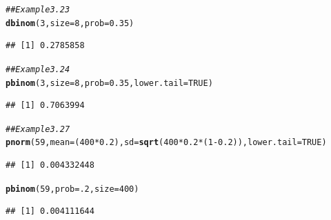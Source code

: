 \documentclass{report}\usepackage[]{graphicx}\usepackage[]{color}
\makeatletter
\newcommand{\hlnum}[1]{\textcolor[rgb]{0.686,0.059,0.569}{#1}}%
\newcommand{\hlcom}[1]{\textcolor[rgb]{0.678,0.584,0.686}{\textit{#1}}}%
\newcommand{\hlopt}[1]{\textcolor[rgb]{0,0,0}{#1}}%
\newcommand{\hlstd}[1]{\textcolor[rgb]{0.345,0.345,0.345}{#1}}%
\newcommand{\hlkwc}[1]{\textcolor[rgb]{0.333,0.667,0.333}{#1}}%
\newcommand{\hlkwd}[1]{\textcolor[rgb]{0.737,0.353,0.396}{\textbf{#1}}}%
\newenvironment{kframe}{%
 \def\at@end@of@kframe{}%
 \ifinner\ifhmode%
  \def\at@end@of@kframe{\end{minipage}}%
  \begin{minipage}{\columnwidth}%
 \fi\fi%
 \def\FrameCommand##1{\hskip\@totalleftmargin \hskip-\fboxsep
 \colorbox{shadecolor}{##1}\hskip-\fboxsep
     \hskip-\linewidth \hskip-\@totalleftmargin \hskip\columnwidth}%
 \MakeFramed {\advance\hsize-\width
   \@totalleftmargin\z@ \linewidth\hsize
   \@setminipage}}%
 {\par\unskip\endMakeFramed%
 \at@end@of@kframe}
\newenvironment{knitrout}{}{} %
\makeatother
\begin{document}
\begin{knitrout}
\color{fgcolor}\begin{kframe}
\begin{alltt}
\hlcom{## Example 3.23}
\hlkwd{dbinom}\hlstd{(}\hlnum{3}\hlstd{,} \hlkwc{size} \hlstd{=} \hlnum{8}\hlstd{,} \hlkwc{prob} \hlstd{=} \hlnum{0.35}\hlstd{)}
\end{alltt}
\begin{verbatim}
## [1] 0.2785858
\end{verbatim}
\end{kframe}
\end{knitrout}

\begin{knitrout}
\color{fgcolor}\begin{kframe}
\begin{alltt}
\hlcom{## Example 3.24}
\hlkwd{pbinom}\hlstd{(}\hlnum{3}\hlstd{,} \hlkwc{size} \hlstd{=} \hlnum{8}\hlstd{,} \hlkwc{prob} \hlstd{=} \hlnum{0.35}\hlstd{,} \hlkwc{lower.tail} \hlstd{=} \hlnum{TRUE}\hlstd{)}
\end{alltt}
\begin{verbatim}
## [1] 0.7063994
\end{verbatim}
\end{kframe}
\end{knitrout}

\begin{knitrout}
\color{fgcolor}\begin{kframe}
\begin{alltt}
\hlcom{## Example 3.27 }
\hlkwd{pnorm}\hlstd{(}\hlnum{59}\hlstd{,} \hlkwc{mean} \hlstd{= (}\hlnum{400}\hlopt{*}\hlnum{0.2}\hlstd{),} \hlkwc{sd} \hlstd{=} \hlkwd{sqrt}\hlstd{(}\hlnum{400}\hlopt{*}\hlnum{0.2}\hlopt{*}\hlstd{(}\hlnum{1}\hlopt{-}\hlnum{0.2}\hlstd{)),} \hlkwc{lower.tail} \hlstd{=} \hlnum{TRUE}\hlstd{)}
\end{alltt}
\begin{verbatim}
## [1] 0.004332448
\end{verbatim}
\begin{alltt}
\hlkwd{pbinom}\hlstd{(}\hlnum{59}\hlstd{,} \hlkwc{prob} \hlstd{=} \hlnum{.2}\hlstd{,} \hlkwc{size} \hlstd{=} \hlnum{400}\hlstd{)}
\end{alltt}
\begin{verbatim}
## [1] 0.004111644
\end{verbatim}
\end{kframe}
\end{knitrout}
\end{document}
